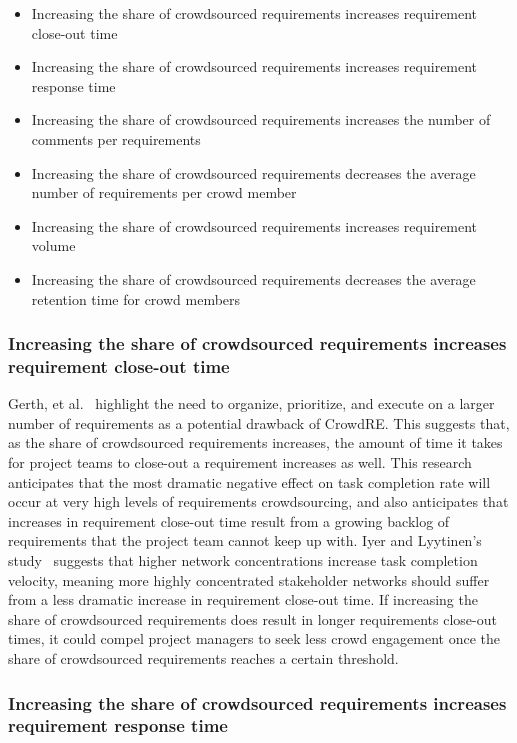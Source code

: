 \begin{itemize}
    \item Increasing the share of crowdsourced requirements increases requirement close-out time
    \item Increasing the share of crowdsourced requirements increases requirement response time
    \item Increasing the share of crowdsourced requirements increases the number of comments per requirements
    \item Increasing the share of crowdsourced requirements decreases the average number of requirements per crowd member
    \item Increasing the share of crowdsourced requirements increases requirement volume
    \item Increasing the share of crowdsourced requirements decreases the average retention time for crowd members
\end{itemize}

\subsubsection{Increasing the share of crowdsourced requirements increases requirement close-out time}

Gerth, et al.~\cite{gerth} highlight the need to organize, prioritize, and execute on a larger number of requirements as a potential drawback of CrowdRE. This suggests that, as the share of crowdsourced requirements increases, the amount of time it takes for project teams to close-out a requirement increases as well. This research anticipates that the most dramatic negative effect on task completion rate will occur at very high levels of requirements crowdsourcing, and also anticipates that increases in requirement close-out time result from a growing backlog of requirements that the project team cannot keep up with. Iyer and Lyytinen's study~\cite{iyer} suggests that higher network concentrations increase task completion velocity, meaning more highly concentrated stakeholder networks should suffer from a less dramatic increase in requirement close-out time. If increasing the share of crowdsourced requirements does result in longer requirements close-out times, it could compel project managers to seek less crowd engagement once the share of crowdsourced requirements reaches a certain threshold.

\subsubsection{Increasing the share of crowdsourced requirements increases requirement response time}

